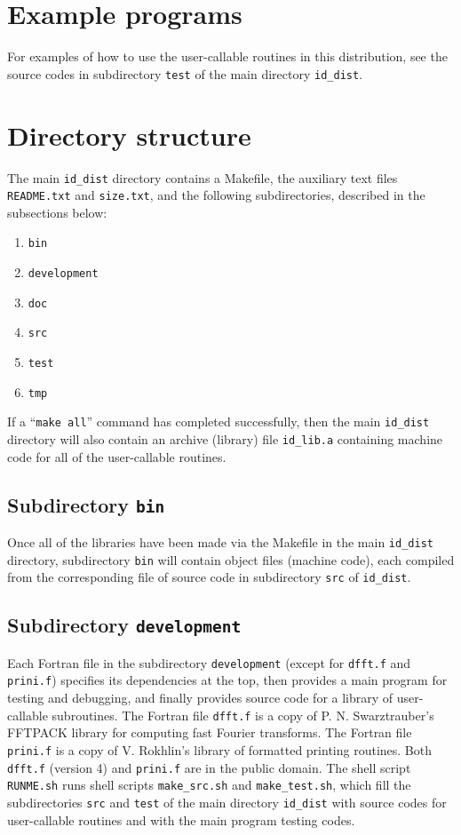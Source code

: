 \documentclass[letterpaper,12pt]{article}
\begin{document}
\section{Example programs}

For examples of how to use the user-callable routines
in this distribution, see the source codes in subdirectory {\tt test}
of the main directory {\tt id\_dist}.



\section{Directory structure}

The main {\tt id\_dist} directory contains a Makefile,
the auxiliary text files {\tt README.txt} and {\tt size.txt},
and the following subdirectories, described in the subsections below:
%
\begin{enumerate}
\item {\tt bin}
\item {\tt development}
\item {\tt doc}
\item {\tt src}
\item {\tt test}
\item {\tt tmp}
\end{enumerate}
%
If a ``{\tt make all}'' command has completed successfully,
then the main {\tt id\_dist} directory will also contain
an archive (library) file {\tt id\_lib.a} containing machine code
for all of the user-callable routines.


\subsection{Subdirectory {\tt bin}}

Once all of the libraries have been made via the Makefile
in the main {\tt id\_dist} directory,
subdirectory {\tt bin} will contain object files (machine code),
each compiled from the corresponding file of source code
in subdirectory {\tt src} of {\tt id\_dist}.


\subsection{Subdirectory {\tt development}}

Each Fortran file in the subdirectory {\tt development}
(except for {\tt dfft.f} and {\tt prini.f})
specifies its dependencies at the top, then provides a main program
for testing and debugging, and finally provides source code
for a library of user-callable subroutines.
The Fortran file {\tt dfft.f} is a copy of P. N. Swarztrauber's FFTPACK library
for computing fast Fourier transforms.
The Fortran file {\tt prini.f} is a copy of V. Rokhlin's library
of formatted printing routines.
Both {\tt dfft.f} (version 4) and {\tt prini.f} are in the public domain.
The shell script {\tt RUNME.sh} runs shell scripts {\tt make\_src.sh}
and {\tt make\_test.sh}, which fill the subdirectories {\tt src}
and {\tt test} of the main directory {\tt id\_dist}
with source codes for user-callable routines
and with the main program testing codes.
\end{document}
